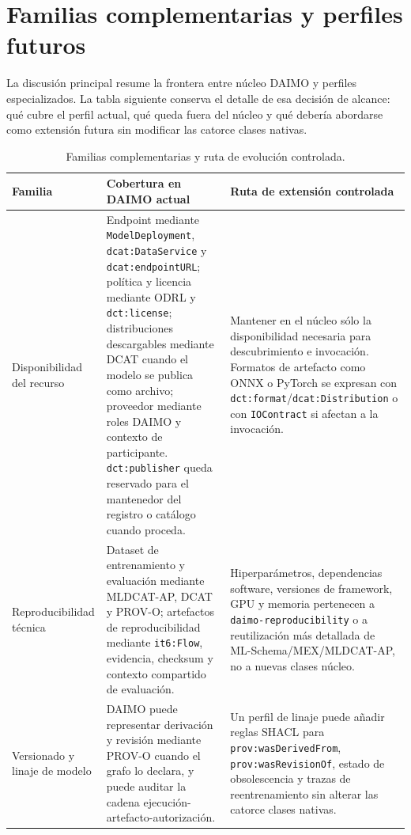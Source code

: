 \documentclass[Afour,sagev,times]{sagej}
\newcommand{\code}[1]{\texttt{#1}}
\begin{document}
\appendix

\section{Familias complementarias y perfiles futuros}\label{app:future-profiles}

La discusión principal resume la frontera entre núcleo DAIMO y perfiles especializados. La tabla siguiente conserva el detalle de esa decisión de alcance: qué cubre el perfil actual, qué queda fuera del núcleo y qué debería abordarse como extensión futura sin modificar las catorce clases nativas.

\begin{table}[tb]
\scriptsize\sf\centering
\caption{Familias complementarias y ruta de evolución controlada.\label{tab:future-profiles}}
\begin{tabular}{@{}p{3.2cm}p{5.9cm}p{6.0cm}@{}}
\toprule
\textbf{Familia} & \textbf{Cobertura en DAIMO actual} & \textbf{Ruta de extensión controlada} \\
\midrule
Disponibilidad del recurso & Endpoint mediante \code{ModelDeployment}, \code{dcat:DataService} y \code{dcat:endpointURL}; política y licencia mediante ODRL y \code{dct:license}; distribuciones descargables mediante DCAT cuando el modelo se publica como archivo; proveedor mediante roles DAIMO y contexto de participante. \code{dct:publisher} queda reservado para el mantenedor del registro o catálogo cuando proceda. & Mantener en el núcleo sólo la disponibilidad necesaria para descubrimiento e invocación. Formatos de artefacto como ONNX o PyTorch se expresan con \code{dct:format}/\code{dcat:Distribution} o con \code{IOContract} si afectan a la invocación. \\
Reproducibilidad técnica & Dataset de entrenamiento y evaluación mediante MLDCAT-AP, DCAT y PROV-O; artefactos de reproducibilidad mediante \code{it6:Flow}, evidencia, checksum y contexto compartido de evaluación. & Hiperparámetros, dependencias software, versiones de framework, GPU y memoria pertenecen a \code{daimo-reproducibility} o a reutilización más detallada de ML-Schema/MEX/MLDCAT-AP, no a nuevas clases núcleo. \\
Versionado y linaje de modelo & DAIMO puede representar derivación y revisión mediante PROV-O cuando el grafo lo declara, y puede auditar la cadena ejecución-artefacto-autorización. & Un perfil de linaje puede añadir reglas SHACL para \code{prov:wasDerivedFrom}, \code{prov:wasRevisionOf}, estado de obsolescencia y trazas de reentrenamiento sin alterar las catorce clases nativas. \\

\end{tabular}
\end{table}
\end{document}
